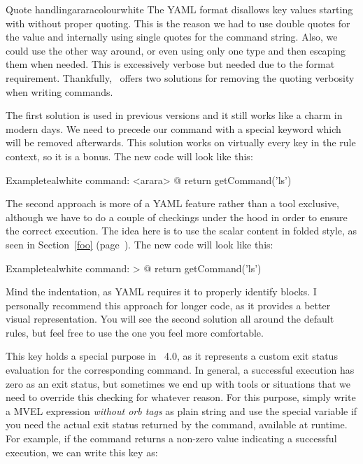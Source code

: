 \begin{description}
\begin{description}
\begin{messagebox}{Quote handling}{araracolour}{\icinfo}{white}
\setlength{\parskip}{1em}
The YAML format disallows key values starting with  without proper quoting. This is the reason we had to use double quotes for the value and internally using single quotes for the command string. Also, we could use the other way around, or even using only one type and then escaping them when needed. This is excessively verbose but needed due to the format requirement. Thankfully, \arara\ offers two solutions for removing the quoting verbosity when writing commands.

The first solution is used in previous versions and it still works like a charm in modern days. We need to precede our command with a special keyword  which will be removed afterwards. This solution works on virtually every key in the rule context, so it is a bonus. The new code will look like this:

\begin{codebox}{Example}{teal}{\icnote}{white}
command: <arara> @{ return getCommand('ls') }
\end{codebox}

The second approach is more of a YAML feature rather than a tool exclusive, although we have to do a couple of checkings under the hood in order to ensure the correct execution. The idea here is to use the scalar content in folded style, as seen in Section~\ref{foo} (page~\pageref{foo}). The new code will look like this:

\begin{codebox}{Example}{teal}{\icnote}{white}
command: >
  @{
    return getCommand('ls')
  }
\end{codebox}

Mind the indentation, as YAML requires it to properly identify blocks. I personally recommend this approach for longer code, as it provides a better visual representation. You will see the second solution all around the default rules, but feel free to use the one you feel more comfortable.
\end{messagebox}

\item[\describecontext{O}{commands}{exit}] This key holds a special purpose in \arara\ 4.0, as it represents a custom exit status evaluation for the corresponding command. In general, a successful execution has zero as an exit status, but sometimes we end up with tools or situations that we need to override this checking for whatever reason. For this purpose, simply write a MVEL expression \emph{without orb tags} as plain string and use the special variable  if you need the actual exit status returned by the command, available at runtime. For example, if the command returns a non-zero value indicating a successful execution, we can write this key as:


\end{description}
\end{description}
